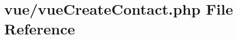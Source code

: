 \hypertarget{vue_create_contact_8php}{}\section{vue/vue\+Create\+Contact.php File Reference}
\label{vue_create_contact_8php}
